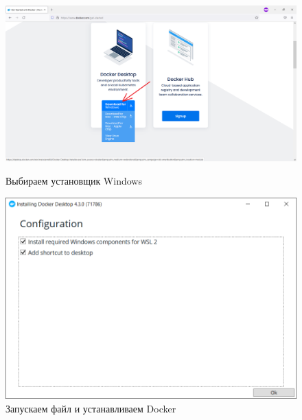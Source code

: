 \begin{figure}[!p]
    \centering
    \begin{minipage}{0.47\textwidth}
        \centering
        \includegraphics[width=\linewidth]
            {_assets/gpi_pz_docker_03.png}
        \caption{Выбираем установщик Windows}
        \label{fig:gpi_pz_docker_03}
    \end{minipage}
    \begin{minipage}{0.47\textwidth}
        \centering
        \includegraphics[width=\linewidth]
            {_assets/gpi_pz_docker_04.png}
        \caption{Запускаем файл и устанавливаем Docker}
        \label{fig:gpi_pz_docker_04}
    \end{minipage}
\end{figure}

